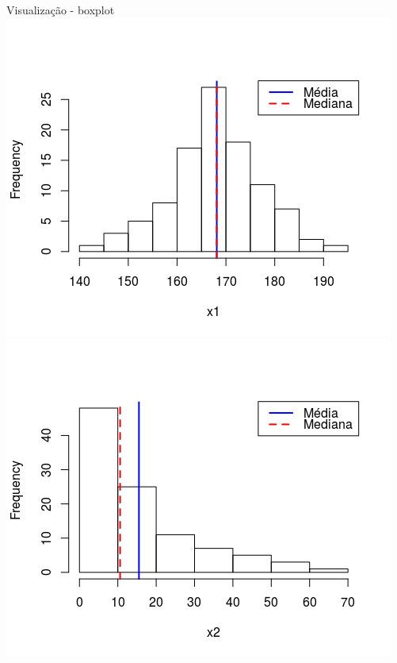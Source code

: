 \documentclass{beamer}
\begin{document}
\begin{frame}{Visualização - boxplot}
  \centering
  \includegraphics[height=.5\textheight]{Cap37-38/normal2-h}
  \includegraphics[height=.5\textheight]{Cap37-38/lognormal2-h}


\end{frame}
\end{document}
